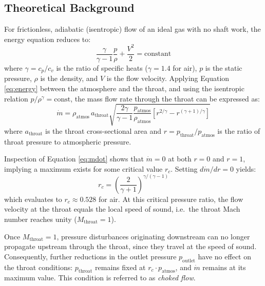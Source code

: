 \subsection{Theoretical Background} \label{sec:introduction/theory}

For frictionless, adiabatic (isentropic) flow of an ideal gas with no shaft work, the energy equation reduces to:
\begin{equation}
    \frac{\gamma}{\gamma - 1} \frac{p}{\rho} + \frac{V^2}{2} = \text{constant}
    \label{eq:energy}
\end{equation}
where \( \gamma = c_p / c_v \) is the ratio of specific heats (\( \gamma = 1.4 \) for air), \( p \) is the static pressure, \( \rho \) is the density, and \( V \) is the flow velocity. Applying Equation \ref{eq:energy} between the atmosphere and the throat, and using the isentropic relation \( p / \rho^\gamma = \text{const} \), the mass flow rate through the throat can be expressed as:
\begin{equation}
    \dot{m} = \rho_\text{atmos} \, a_\text{throat} \sqrt{\frac{2\gamma}{\gamma-1}
    \frac{p_\text{atmos}}{\rho_\text{atmos}} \left[ r^{2/\gamma} - r^{(\gamma+1)/\gamma} \right]}
    \label{eq:mdot}
\end{equation}
where \( a_\text{throat} \) is the throat cross-sectional area and \( r = p_\text{throat} / p_\text{atmos} \) is the ratio of throat pressure to atmospheric pressure.

Inspection of Equation \ref{eq:mdot} shows that \( \dot{m} = 0 \) at both \( r = 0 \) and \( r = 1 \), implying a maximum exists for some critical value \( r_c \). Setting \( d\dot{m}/dr = 0 \) yields:
\begin{equation}
    r_c = \left( \frac{2}{\gamma + 1} \right)^{\gamma / (\gamma - 1)}
    \label{eq:rc}
\end{equation}
which evaluates to \( r_c \approx 0.528 \) for air. At this critical pressure ratio, the flow velocity at the throat equals the local speed of sound, i.e.\ the throat Mach number reaches unity (\( M_\text{throat} = 1 \)).

Once \( M_\text{throat} = 1 \), pressure disturbances originating downstream can no longer propagate upstream through the throat, since they travel at the speed of sound. Consequently, further reductions in the outlet pressure \( p_\text{outlet} \) have no effect on the throat conditions: \( p_\text{throat} \) remains fixed at \( r_c \cdot p_\text{atmos} \), and \( \dot{m} \) remains at its maximum value. This condition is referred to as \textit{choked flow}.

